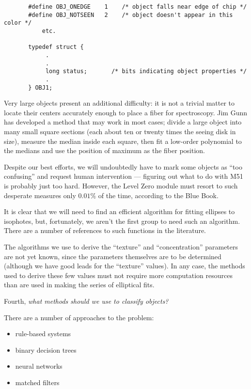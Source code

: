 \begin {verbatim}
       #define OBJ_ONEDGE    1    /* object falls near edge of chip */
       #define OBJ_NOTSEEN   2    /* object doesn't appear in this color */
           etc.

       typedef struct {
            .
            .
            long status;       /* bits indicating object properties */
            .
       } OBJ1;
\end{verbatim}

Very large objects present an additional difficulty: it is not a trivial
matter to locate their centers accurately enough to place a fiber
for spectroscopy.  Jim Gunn has developed a method that may work
in most cases; divide a large object into many small square sections
(each about ten or twenty times the seeing disk in size), measure 
the median inside each square, then fit a low-order polynomial
to the medians and use the position of maximum as the fiber position.

Despite our best efforts, we will undoubtedly have to mark some objects
as ``too confusing'' and request human intervention --- figuring
out what to do with M51 is probably just too hard.  However, 
the Level Zero module must resort to such desperate measures
only $0.01\%$ of the time, according to the Blue Book.

It is clear that we will need to find an efficient algorithm for 
fitting ellipses to isophotes, but, fortunately, we aren't the first
group to need such an algorithm.   There are a number of references
to such functions in the literature.

The algorithms we use to derive the ``texture'' and ``concentration''
parameters are not yet known, since the parameters themselves are
to be determined (although we have good leads for the ``texture''
values).
In any case, the methods used to derive these
few values must not require more computation resources than are used
in making the series of elliptical fits.
  
\medskip

  Fourth, {\it what methods should we use to classify objects?}

  There are a number of approaches to the problem:

\begin {itemize}
   \item rule-based systems
   \item binary decision trees
   \item neural networks
   \item matched filters
\end {itemize}

